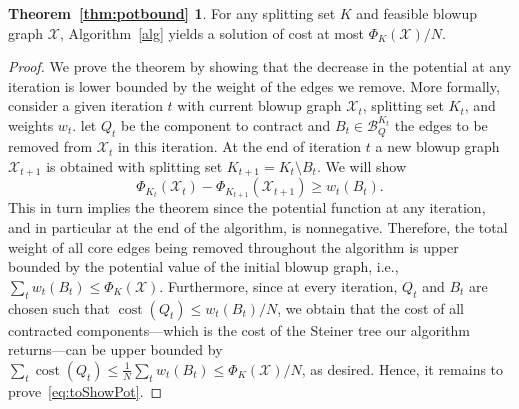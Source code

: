\documentclass[11pt, letterpaper]{article}
\theoremstyle{definition}
\DeclareMathOperator{\cost}{cost}
\newcommand{\grphx}{\mathcal{X}}
\newcommand{\pot}[2]{\Phi_{#1}(#2)}
\begin{document}
\medskip

\newtheorem*{theorempotbound}{Theorem~\ref{thm:potbound}}

\begin{theorempotbound}
	For any splitting set $K$ and feasible blowup graph $\grphx$, Algorithm~\ref{alg} yields a solution of cost at most $\pot{K}{\grphx}/N$.
\end{theorempotbound}
\begin{proof}
We prove the theorem by showing that the decrease in the potential at any 
iteration is lower bounded by the weight of the edges we remove. More formally, 
consider a given iteration $t$ with current blowup graph $\grphx_t$, 
splitting set $K_t$, and weights $w_t$. let
$Q_t$ be the component to contract and $B_t\in \mathcal{B}_Q^{K_t}$ the edges
to be removed from $\grphx_t$ in this iteration.
At the end of iteration $t$ a new blowup graph
$\grphx_{t+1}$ is obtained with splitting set $K_{t+1}=K_t\setminus B_t$.
We will show
\begin{equation}\label{eq:toShowPot}
\pot{K_t}{\grphx_t}-\pot{K_{t+1}}{\grphx_{t+1}}\geq w_t(B_t).
\end{equation}
This in turn implies the theorem since the potential function at any
iteration, and in particular at the end of the algorithm, is nonnegative.
Therefore, the total weight of all core edges being removed throughout
the algorithm is upper bounded by the potential value of the initial
blowup graph, i.e., $\sum_t w_t(B_t) \leq \pot{K}{\grphx}$.
Furthermore, since at every iteration, $Q_t$ and $B_t$
are chosen such that $\cost(Q_t)\leq w_t(B_t)/N$, we obtain that
the cost of all contracted components---which is the cost of the Steiner
tree our algorithm returns---can be upper bounded by
$\sum_t \cost(Q_t)\leq \frac{1}{N}\sum_t w_t(B_t) \leq \pot{K}{\grphx}/N$,
as desired.
Hence, it remains to prove~\eqref{eq:toShowPot}.


\end{proof}
\end{document}

